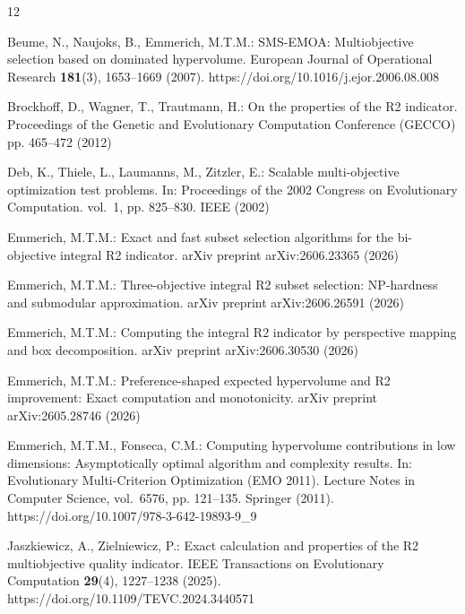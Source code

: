 \documentclass[runningheads]{llncs}
\begin{document}
\begin{thebibliography}{12}
\providecommand{\url}[1]{\texttt{#1}}
\providecommand{\urlprefix}{URL }
\providecommand{\doi}[1]{https://doi.org/#1}

Beume, N., Naujoks, B., Emmerich, M.T.M.: {SMS-EMOA}: Multiobjective selection
  based on dominated hypervolume. European Journal of Operational Research
  \textbf{181}(3),  1653--1669 (2007). \doi{10.1016/j.ejor.2006.08.008}

Brockhoff, D., Wagner, T., Trautmann, H.: On the properties of the {R2}
  indicator. Proceedings of the Genetic and Evolutionary Computation Conference
  (GECCO) pp. 465--472 (2012)

Deb, K., Thiele, L., Laumanns, M., Zitzler, E.: Scalable multi-objective
  optimization test problems. In: Proceedings of the 2002 Congress on
  Evolutionary Computation. vol.~1, pp. 825--830. IEEE (2002)

Emmerich, M.T.M.: Exact and fast subset selection algorithms for the
  bi-objective integral {R2} indicator. arXiv preprint arXiv:2606.23365 (2026)

Emmerich, M.T.M.: Three-objective integral {R2} subset selection: {NP}-hardness
  and submodular approximation. arXiv preprint arXiv:2606.26591 (2026)

Emmerich, M.T.M.: Computing the integral {R2} indicator by perspective mapping
  and box decomposition. arXiv preprint arXiv:2606.30530  (2026)

Emmerich, M.T.M.: Preference-shaped expected hypervolume and {R2} improvement:
  Exact computation and monotonicity. arXiv preprint arXiv:2605.28746  (2026)

Emmerich, M.T.M., Fonseca, C.M.: Computing hypervolume contributions in low
  dimensions: Asymptotically optimal algorithm and complexity results. In:
  Evolutionary Multi-Criterion Optimization (EMO 2011). Lecture Notes in
  Computer Science, vol.~6576, pp. 121--135. Springer (2011).
  \doi{10.1007/978-3-642-19893-9_9}

Jaszkiewicz, A., Zielniewicz, P.: Exact calculation and properties of the {R2}
  multiobjective quality indicator. IEEE Transactions on Evolutionary
  Computation  \textbf{29}(4),  1227--1238 (2025).
  \doi{10.1109/TEVC.2024.3440571}


\end{thebibliography}
\end{document}
